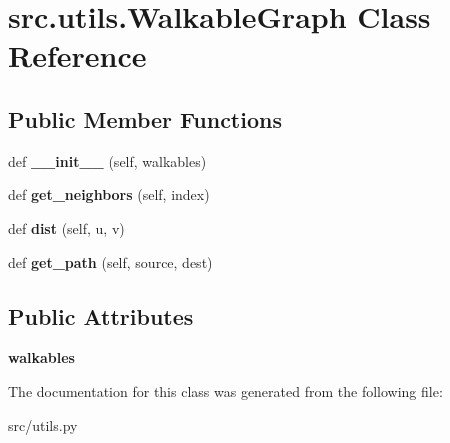 \hypertarget{classsrc_1_1utils_1_1_walkable_graph}{}\section{src.\+utils.\+Walkable\+Graph Class Reference}
\label{classsrc_1_1utils_1_1_walkable_graph}
\subsection*{Public Member Functions}
\begin{DoxyCompactItemize}
\item 
\hypertarget{classsrc_1_1utils_1_1_walkable_graph_a087591970d0d87689913f3235c13ddb1}{}\label{classsrc_1_1utils_1_1_walkable_graph_a087591970d0d87689913f3235c13ddb1} 
def {\bfseries \+\_\+\+\_\+init\+\_\+\+\_\+} (self, walkables)
\item 
\hypertarget{classsrc_1_1utils_1_1_walkable_graph_a1654a649f182a6839bae35b08a44a18c}{}\label{classsrc_1_1utils_1_1_walkable_graph_a1654a649f182a6839bae35b08a44a18c} 
def {\bfseries get\+\_\+neighbors} (self, index)
\item 
\hypertarget{classsrc_1_1utils_1_1_walkable_graph_a03177c28b206b2d99a67cbe76f1c1f6b}{}\label{classsrc_1_1utils_1_1_walkable_graph_a03177c28b206b2d99a67cbe76f1c1f6b} 
def {\bfseries dist} (self, u, v)
\item 
\hypertarget{classsrc_1_1utils_1_1_walkable_graph_afd2df4fd215571707ca30ce6776fe1ce}{}\label{classsrc_1_1utils_1_1_walkable_graph_afd2df4fd215571707ca30ce6776fe1ce} 
def {\bfseries get\+\_\+path} (self, source, dest)
\end{DoxyCompactItemize}
\subsection*{Public Attributes}
\begin{DoxyCompactItemize}
\item 
\hypertarget{classsrc_1_1utils_1_1_walkable_graph_a9fbab0afaa540fdd79c43a2ce7da2527}{}\label{classsrc_1_1utils_1_1_walkable_graph_a9fbab0afaa540fdd79c43a2ce7da2527} 
{\bfseries walkables}
\end{DoxyCompactItemize}


The documentation for this class was generated from the following file\+:\begin{DoxyCompactItemize}
\item 
src/utils.\+py\end{DoxyCompactItemize}
